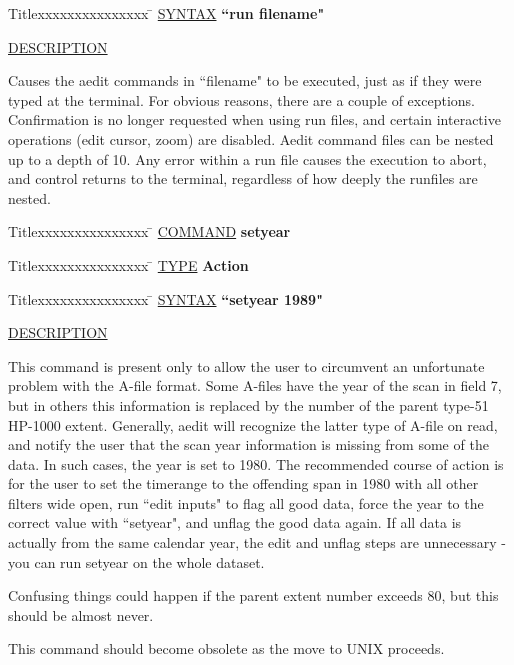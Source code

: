 \begin{tabbing}
Titlexxxxxxxxxxxxxxx \= \kill
\underline{SYNTAX} \> {\bf 		``run filename"} \\
\end{tabbing}

\underline{DESCRIPTION}
\begin{list}{}{\setlength{\leftmargin}{0.5in}
     \setlength{\rightmargin}{0in}}
\item
Causes the aedit commands in ``filename" to be executed, just
as if they were typed at the terminal.  For obvious reasons,
there are a couple of exceptions.  Confirmation is no longer
requested when using run files, and certain interactive
operations (edit cursor, zoom) are disabled.  Aedit command
files can be nested up to a depth of 10.  Any error within
a run file causes the execution to abort, and control returns
to the terminal, regardless of how deeply the runfiles are
nested.
\end{list}
\vspace{.2in}

\begin{tabbing}
Titlexxxxxxxxxxxxxxx \= \kill
\underline{COMMAND} \> {\bf 	setyear} \\
\end{tabbing}

\begin{tabbing}
Titlexxxxxxxxxxxxxxx \= \kill
\underline{TYPE} \> {\bf 		Action} \\
\end{tabbing}

\begin{tabbing}
Titlexxxxxxxxxxxxxxx \= \kill
\underline{SYNTAX} \> {\bf 		``setyear 1989"} \\
\end{tabbing}

\underline{DESCRIPTION}
\begin{list}{}{\setlength{\leftmargin}{0.5in}
     \setlength{\rightmargin}{0in}}
\item
This command is present only to allow the user to circumvent an
unfortunate problem with the A-file format.  Some A-files have
the year of the scan in field 7, but in others this information
is replaced by the number of the parent type-51 HP-1000 extent.
Generally, aedit will recognize the latter type of A-file on
read, and notify the user that the scan year information is
missing from some of the data.  In such cases, the year is set
to 1980.  The recommended course of action is for the user to
set the timerange to the offending span in 1980 with all other
filters wide open, run ``edit inputs" to flag all good data,
force the year to the correct value with ``setyear", and unflag
the good data again.  If all data is actually from the same
calendar year, the edit and unflag steps are unnecessary - you
can run setyear on the whole dataset.
\item
Confusing things could happen if the parent extent number exceeds
80, but this should be almost never.
\item
This command should become obsolete as the move to UNIX proceeds.
\end{list}
\vspace{.2in}

